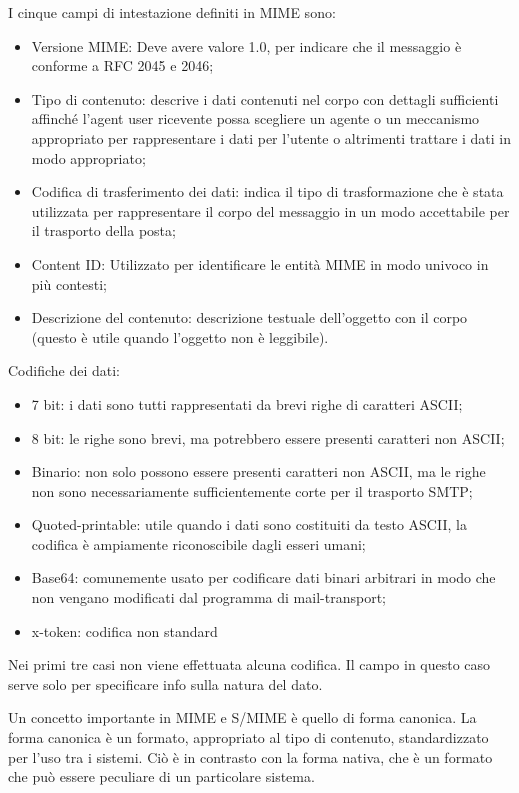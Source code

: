 I cinque campi di intestazione definiti in MIME sono:
\begin{itemize}
    \item Versione MIME: Deve avere valore 1.0, per indicare che il messaggio è conforme a RFC 2045 e 2046;
	\item Tipo di contenuto: descrive i dati contenuti nel corpo con dettagli sufficienti affinché l'agent user ricevente possa scegliere un agente o un meccanismo appropriato per rappresentare i dati per l'utente o altrimenti trattare i dati in modo appropriato;
	\item Codifica di trasferimento dei dati: indica il tipo di trasformazione che è stata utilizzata per rappresentare il corpo del messaggio in un modo accettabile per il trasporto della posta;
	\item Content ID: Utilizzato per identificare le entità MIME in modo univoco in più contesti;
	\item Descrizione del contenuto: descrizione testuale dell'oggetto con il corpo (questo è utile quando l'oggetto non è leggibile).
\end{itemize}

Codifiche dei dati:
\begin{itemize}
    \item 7 bit: i dati sono tutti rappresentati da brevi righe di caratteri ASCII;
    \item 8 bit: le righe sono brevi, ma potrebbero essere presenti caratteri non ASCII;
    \item Binario: non solo possono essere presenti caratteri non ASCII, ma le righe non sono necessariamente sufficientemente corte per il trasporto SMTP;
    \item Quoted-printable: utile quando i dati sono costituiti da testo ASCII, la codifica è ampiamente riconoscibile dagli esseri umani;
    \item Base64: comunemente usato per codificare dati binari arbitrari in modo che non vengano modificati dal programma di mail-transport;
    \item x-token: codifica non standard
\end{itemize}

Nei primi tre casi non viene effettuata alcuna codifica. Il campo in questo caso serve solo per specificare info sulla natura del dato.

Un concetto importante in MIME e S/MIME è quello di forma canonica. La forma canonica è un formato, appropriato al tipo di contenuto, standardizzato per l'uso tra i sistemi. Ciò è in contrasto con la forma nativa, che è un formato che può essere peculiare di un particolare sistema.

